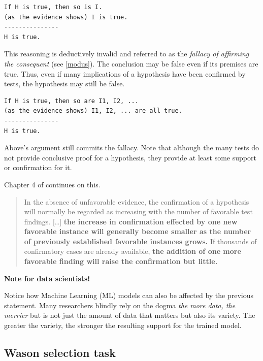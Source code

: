 \documentclass[
]{book}
\newenvironment{rnote}{\par\raggedleft}{\par}
\begin{document}
\begin{verbatim}
If H is true, then so is I.
(as the evidence shows) I is true.
---------------
H is true.
\end{verbatim}

This reasoning is deductively invalid and referred to as the \emph{fallacy of affirming the consequent} (see \ref{modus}). The conclusion may be false even if its premises are true. Thus, even if many implications of a hypothesis have been confirmed by tests, the hypothesis may still be false.

\begin{verbatim}
If H is true, then so are I1, I2, ...
(as the evidence shows) I1, I2, ... are all true.
---------------
H is true.
\end{verbatim}

Above's argument still commits the fallacy. Note that although the many tests do not provide conclusive proof for a hypothesis, they provide at least some support or confirmation for it.

\begin{rnote}
Chapter 4 of \citep{hempel-pos} continues on this.

\end{rnote}

\begin{quote}
In the absence of unfavorable evidence, the confirmation of a hypothesis will normally be regarded as increasing with the number of favorable test findings. {[}\ldots{]} \textbf{the increase in confirmation effected by one new favorable instance will generally become smaller as the number of previously established favorable instances grows.} If thousands of confirmatory cases are already available, \textbf{the addition of one more favorable finding will raise the confirmation but little.}
\end{quote}

\begin{tipbox}

\textbf{Note for data scientists!}

Notice how Machine Learning (ML) models can also be affected by the previous statement. Many researchers blindly rely on the dogma \emph{the more data, the merrier} but is not just the amount of data that matters but also its variety. The greater the variety, the stronger the resulting support for the trained model.

\end{tipbox}

\hypertarget{wason}{%
\subsection{Wason selection task}\label{wason}}
\end{document}

